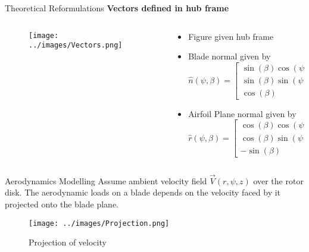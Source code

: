 \begin{frame}{Theoretical Reformulations}
    \textbf{Vectors defined in hub frame}
    \begin{columns}[T] %
        \begin{column}{0.5\textwidth}
            \begin{figure}
                \centering
                \texttt{[image: ../images/Vectors.png]}
            \end{figure}
        \end{column}
        
        \begin{column}{0.5\textwidth}
            \begin{itemize}
                \item Figure given hub frame
                \item Blade normal given by
                $$
                \hat{n}(\psi,\beta) = \begin{bmatrix}
                    \sin(\beta)\cos(\psi) \\
                    \sin(\beta)\sin(\psi) \\
                    \cos(\beta)
                \end{bmatrix}
                $$
                \item Airfoil Plane normal given by 
                $$
                \hat{r}(\psi,\beta) = \begin{bmatrix}
                    \cos(\beta)\cos(\psi) \\
                    \cos(\beta)\sin(\psi) \\
                    -\sin(\beta)
                \end{bmatrix}
                $$
            \end{itemize}
        \end{column}
    \end{columns}
\end{frame}
\begin{frame}{Aerodynamics Modelling}
    Assume ambient velocity field $\vec{V}(r,\psi,z)$ over the rotor disk. The aerodynamic loads on a blade depends on the velocity faced by it projected onto the blade plane.
    \begin{figure}
        \centering
        \texttt{[image: ../images/Projection.png]}
        \caption{Projection of velocity}
    \end{figure}
\end{frame}
